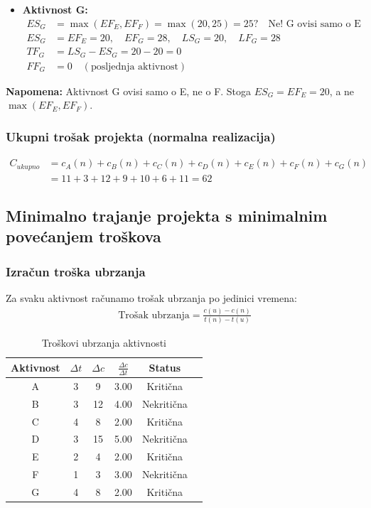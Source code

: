 \documentclass[12pt,a4paper]{article}
\begin{document}
\begin{itemize}
\item \textbf{Aktivnost G:}
  \begin{align}
  ES_G &= \max(EF_E, EF_F) = \max(20, 25) = 25? \quad \text{Ne! G ovisi samo o E} \\
  ES_G &= EF_E = 20, \quad EF_G = 28, \quad LS_G = 20, \quad LF_G = 28 \\
  TF_G &= LS_G - ES_G = 20 - 20 = 0 \\
  FF_G &= 0 \quad (\text{posljednja aktivnost})
  \end{align}
\end{itemize}

\textbf{Napomena:} Aktivnost G ovisi samo o E, ne o F. Stoga $ES_G = EF_E = 20$, a ne $\max(EF_E, EF_F)$.

\subsubsection{Ukupni trošak projekta (normalna realizacija)}

\begin{align}
C_{ukupno} &= c_A(n) + c_B(n) + c_C(n) + c_D(n) + c_E(n) + c_F(n) + c_G(n) \\
&= 11 + 3 + 12 + 9 + 10 + 6 + 11 = 62
\end{align}

\subsection{Minimalno trajanje projekta s minimalnim povećanjem troškova}

\subsubsection{Izračun troška ubrzanja}

Za svaku aktivnost računamo trošak ubrzanja po jedinici vremena:
\begin{align}
\text{Trošak ubrzanja} = \frac{c(u) - c(n)}{t(n) - t(u)}
\end{align}

\begin{table}[h]
\centering
\begin{tabular}{cccccc}
\toprule
Aktivnost & $\Delta t$ & $\Delta c$ & $\frac{\Delta c}{\Delta t}$ & Status \\
\midrule
A & 3 & 9 & 3.00 & Kritična \\
B & 3 & 12 & 4.00 & Nekritična \\
C & 4 & 8 & 2.00 & Kritična \\
D & 3 & 15 & 5.00 & Nekritična \\
E & 2 & 4 & 2.00 & Kritična \\
F & 1 & 3 & 3.00 & Nekritična \\
G & 4 & 8 & 2.00 & Kritična \\
\bottomrule
\end{tabular}
\caption{Troškovi ubrzanja aktivnosti}
\end{table}
\end{document}
